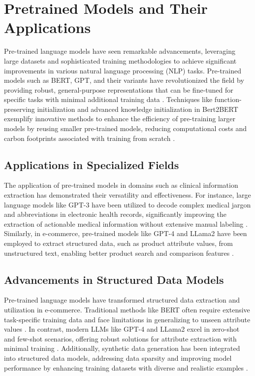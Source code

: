 \section{Pretrained Models and Their Applications}
Pre-trained language models have seen remarkable advancements, leveraging large datasets and sophisticated training methodologies to achieve significant improvements in various natural language processing (NLP) tasks. Pre-trained models such as BERT, GPT, and their variants have revolutionized the field by providing robust, general-purpose representations that can be fine-tuned for specific tasks with minimal additional training data \citep{chen-etal-2022-bert2bert}. Techniques like function-preserving initialization and advanced knowledge initialization in Bert2BERT exemplify innovative methods to enhance the efficiency of pre-training larger models by reusing smaller pre-trained models, reducing computational costs and carbon footprints associated with training from scratch \citep{chen-etal-2022-bert2bert}.

\subsection{Applications in Specialized Fields}
The application of pre-trained models in domains such as clinical information extraction has demonstrated their versatility and effectiveness. For instance, large language models like GPT-3 have been utilized to decode complex medical jargon and abbreviations in electronic health records, significantly improving the extraction of actionable medical information without extensive manual labeling \citep{agrawal2022large}. Similarly, in e-commerce, pre-trained models like GPT-4 and LLama2 have been employed to extract structured data, such as product attribute values, from unstructured text, enabling better product search and comparison features \citep{brinkmann2024product}. 

\subsection{Advancements in Structured Data Models}
Pre-trained language models have transformed structured data extraction and utilization in e-commerce. Traditional methods like BERT often require extensive task-specific training data and face limitations in generalizing to unseen attribute values \citep{brinkmann2024product}. In contrast, modern LLMs like GPT-4 and LLama2 excel in zero-shot and few-shot scenarios, offering robust solutions for attribute extraction with minimal training \citep{brinkmann2024product}. Additionally, synthetic data generation has been integrated into structured data models, addressing data sparsity and improving model performance by enhancing training datasets with diverse and realistic examples \citep{skondras2023generating}.

